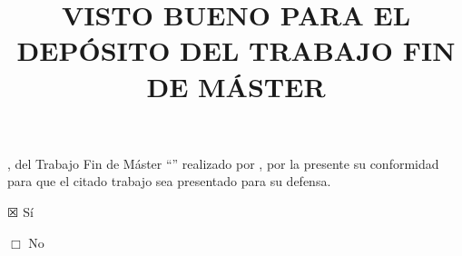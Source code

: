 %

\title{VISTO BUENO \MakeUppercase{\mybookDelOrDeLos{}
    \mybookTutorOrTutores} PARA EL DEPÓSITO DEL TRABAJO FIN DE MÁSTER} 
\date{}                                            %


{\Large
\maketitle 

\thispagestyle{empty}

\vspace{1cm}

\mybookadvisorsConDon, \mybookTutorOrTutores{} del Trabajo Fin de Máster
``\mybooktitle'' realizado por \donOrDonaAutor{} \myAuthorFullName, por la
presente \mybookDaOrDan{} su conformidad para que el citado trabajo sea
presentado para su defensa.

\vspace{1cm}

$\XBox$ Sí

\vspace{0.5cm}

$\Box$ No

\vspace{2cm}


\vspace{4cm}


}


